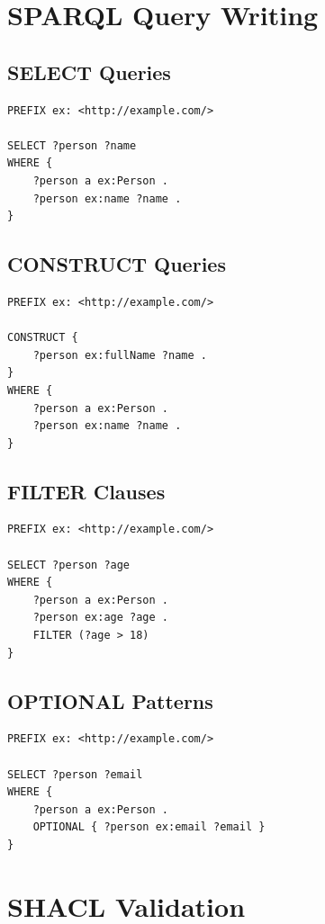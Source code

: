 \section{SPARQL Query Writing}

\subsection{SELECT Queries}

\begin{verbatim}
PREFIX ex: <http://example.com/>

SELECT ?person ?name
WHERE {
    ?person a ex:Person .
    ?person ex:name ?name .
}
\end{verbatim}

\subsection{CONSTRUCT Queries}

\begin{verbatim}
PREFIX ex: <http://example.com/>

CONSTRUCT {
    ?person ex:fullName ?name .
}
WHERE {
    ?person a ex:Person .
    ?person ex:name ?name .
}
\end{verbatim}

\subsection{FILTER Clauses}

\begin{verbatim}
PREFIX ex: <http://example.com/>

SELECT ?person ?age
WHERE {
    ?person a ex:Person .
    ?person ex:age ?age .
    FILTER (?age > 18)
}
\end{verbatim}

\subsection{OPTIONAL Patterns}

\begin{verbatim}
PREFIX ex: <http://example.com/>

SELECT ?person ?email
WHERE {
    ?person a ex:Person .
    OPTIONAL { ?person ex:email ?email }
}
\end{verbatim}

\section{SHACL Validation}

